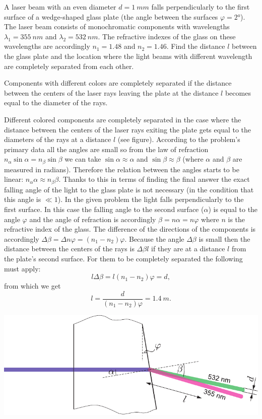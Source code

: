 A laser beam with an even diameter $d=\SI{1}{mm}$ falls perpendicularly to the first surface of a wedge-shaped glass plate (the angle between the surfaces $\varphi=\ang{2}$). The laser beam consists of monochromatic components with wavelengths $\lambda_1=\SI{355}{nm}$ and $\lambda_2=\SI{532}{nm}$. The refractive indexes of the glass on these wavelengths are accordingly $n_1=\num{1.48}$ and $n_2=\num{1.46}$. Find the distance $l$ between the glass plate and the location where the light beams with different wavelength are completely separated from each other.

\hinteng
Components with different colors are completely separated if the distance between the centers of the laser rays leaving the plate at the distance $l$ becomes equal to the diameter of the rays.

\solueng
Different colored components are completely separated in the case where the distance between the centers of the laser rays exiting the plate gets equal to the diameters of the rays at a distance $l$ (see figure). According to the problem’s primary data all the angles are small so from the law of refraction $n_\alpha\sin\alpha=n_\beta\sin\beta$ we can take $\sin\alpha\approx\alpha$ and $\sin\beta\approx\beta$ (where $\alpha$ and $\beta$ are measured in radians). Therefore the relation between the angles starts to be linear: $n_\alpha\alpha\approx n_\beta\beta$. Thanks to this in terms of finding the final answer the exact falling angle of the light to the glass plate is not necessary (in the condition that this angle is $\ll 1$). In the given problem the light falls perpendicularly to the first surface. In this case the falling angle to the second surface ($\alpha$) is equal to the angle $\varphi$ and the angle of refraction is accordingly $\beta=n\alpha=n\varphi$ where $n$ is the refractive index of the glass. The difference of the directions of the components is accordingly $\Delta\beta=\Delta n\varphi=(n_1-n_2)\varphi$. Because the angle $\Delta\beta$ is small then the distance between the centers of the rays is $\Delta\beta l$ if they are at a distance $l$ from the plate’s second surface. For them to be completely separated the following must apply:
\[
l\Delta\beta=l(n_1-n_2)\varphi=d,
\]
from which we get
\[
l = \frac{d}{(n_1-n_2)\varphi} = \SI{1.4}{m}.
\]
\begin{center}
	\includegraphics[width=0.93\linewidth]{2017-v3g-03-laser-lahend}
\end{center}
\probend